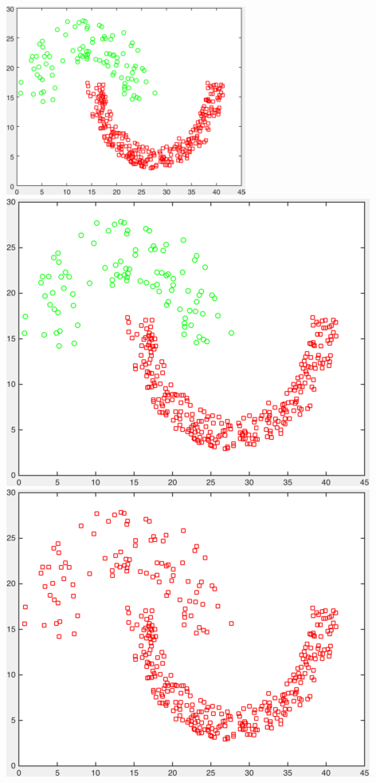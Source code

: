 \documentclass[11pt]{article}
\begin{document}
\begin{center}
\includegraphics[scale=0.5]{jain} \ 
\includegraphics[scale=0.25]{results_spectral_jain} \ 
\includegraphics[scale=0.25]{results_kmeans_jain}
\end{center}
\end{document}
